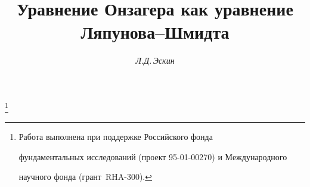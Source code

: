 











\newcommand{\tts}[1]{}










\setcounter{page}{71}












\author{\it Л.Д.\,Эскин}




\title{Уравнение Онзагера как уравнение Ляпунова--Шмидта}





\thanks{Работа выполнена при поддержке Российского фонда


фундаментальных исследований (проект 95-01-00270) и Международного


научного фонда (грант \No\,RHA-300).}


\date{}







\pagestyle{plain} %








